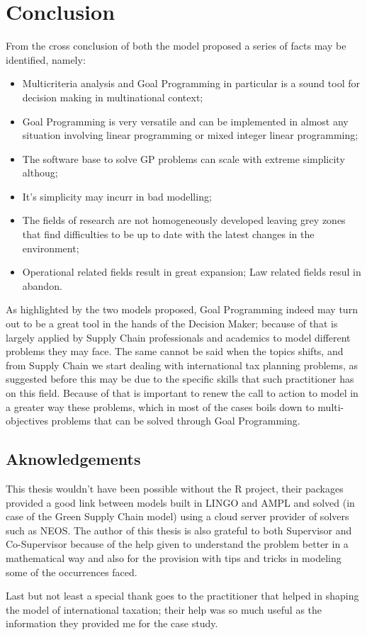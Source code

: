 \clearpage{\pagestyle{empty}\cleardoublepage}
\chapter*{Conclusion}

\begin{doublespace}
From the cross conclusion of both the model proposed a series of facts may be identified, namely:
\begin{itemize}
	\item Multicriteria analysis and Goal Programming in particular is a sound tool for decision making in multinational context;
	\item Goal Programming is very versatile and can be implemented in almost any situation involving linear programming or mixed integer linear programming;
	\item The software base to solve GP problems can scale with extreme simplicity althoug;
	\item It's simplicity may incurr in bad modelling;
	\item The fields of research are not homogeneously developed leaving grey zones that find difficulties to be up to date with the latest changes in the environment;
	\item Operational related fields result in great expansion;
	\iten Law related fields resul in abandon.
\end{itemize}


As highlighted by the two models proposed, Goal Programming indeed may turn out to be a great tool in the hands of the Decision Maker; because of that is largely applied by Supply Chain professionals and academics to model different problems they may face. The same cannot be said when the topics shifts, and from Supply Chain we start dealing with international tax planning problems, as suggested before this may be due to the specific skills that such practitioner has on this field. Because of that is important to renew the call to action to model in a greater way these problems, which in most of the cases boils down to multi-objectives problems that can be solved through Goal Programming.

\section{Aknowledgements}
This thesis wouldn't have been possible without the R project, their packages provided a good link between models built in LINGO and AMPL and solved (in case of the Green Supply Chain model) using a cloud server provider of solvers such as NEOS. The author of this thesis is also grateful to both Supervisor and Co-Supervisor because of the help given to understand the problem better in a mathematical way and also for the provision with tips and tricks in modeling some of the occurrences faced.

Last but not least a special thank goes to the practitioner that helped in shaping the model of international taxation; their help was so much useful as the information they provided me for the case study.    
\end{doublespace}

\clearpage{\pagestyle{empty}\cleardoublepage}
